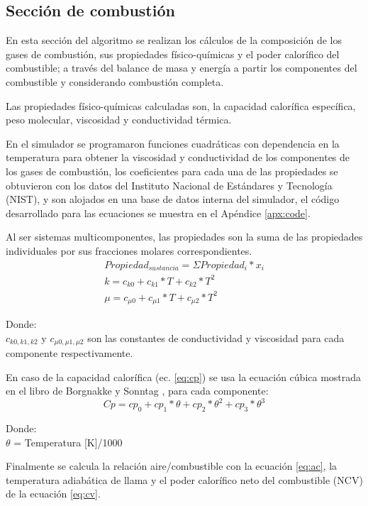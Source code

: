 \subsection{Sección de combustión}
\par En esta sección del algoritmo se realizan los cálculos de la composición de los gases de combustión, sus propiedades físico-químicas y el poder calorífico del combustible; a través del balance de masa y energía a partir los componentes del combustible y considerando combustión completa.
\par Las propiedades físico-químicas calculadas son, la capacidad calorífica específica, peso molecular, viscosidad y conductividad térmica.
\par En el simulador se programaron funciones cuadráticas con dependencia en la temperatura para obtener la viscosidad y conductividad de los componentes de los gases de combustión, los coeficientes para cada una de las propiedades se obtuvieron con los datos del Instituto Nacional de Estándares y Tecnología (NIST)\cite{nist}, y son alojados en una base de datos interna del simulador, el código desarrollado para las ecuaciones se muestra en el Apéndice \ref{apx:code}.
\par Al ser sistemas multicomponentes, las propiedades son la suma de las propiedades individuales por sus fracciones molares correspondientes.
\begin{gather}
    Propiedad_{sustancia} = \Sigma Propiedad_{i} * x_i \\
    k = c_{k0} + c_{k1}*T + c_{k2}*T^2 \\
    \mu = c_{\mu0} + c_{\mu1}*T + c_{\mu2}*T^2
\end{gather}
\par Donde:\\
$c_{k0,k1,k2}$ y $c_{\mu0,\mu1,\mu2}$ son las constantes de conductividad y viscosidad para cada componente respectivamente.
\par En caso de la capacidad calorífica (ec. \ref{eq:cp}) se usa la ecuación cúbica mostrada en el libro de Borgnakke y Sonntag \cite{bib:vanwylen}, para cada componente: 
\begin{equation}
\label{eq:cp}
    Cp = cp_0 + cp_1*\theta + cp_2*\theta^2 + cp_3*\theta^3
\end{equation}
\par Donde:\\
$\theta$ = Temperatura [K]/1000
\par Finalmente se calcula la relación aire/combustible con la ecuación \ref{eq:ac}, la temperatura adiabática de llama y el poder calorífico neto del combustible (NCV) de la ecuación \ref{eq:cv}.

